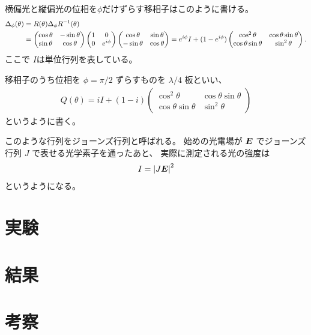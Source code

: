 \documentclass[9pt,dvipdfmx,a4paper]{jsarticle}
\begin{document}
横偏光と縦偏光の位相を\(\phi\)だけずらす移相子はこのように書ける。
\begin{align}
    \Delta_\phi(\theta) &= R(\theta) \Delta_\phi  R^{-1}(\theta) \notag\\
    &= \begin{pmatrix}
        \cos \theta & -\sin\theta\\
        \sin\theta & \cos\theta
    \end{pmatrix}
    \begin{pmatrix}
        1 & 0\\
        0 & e^{i\phi}
    \end{pmatrix}
    \begin{pmatrix}
        \cos \theta & \sin\theta\\
        -\sin\theta & \cos\theta
    \end{pmatrix}
    =e^{i\phi} I + (1-e^{i\phi})\begin{pmatrix}
        \cos^2 \theta & \cos\theta\sin\theta\\
        \cos\theta\sin\theta & \sin^2\theta
    \end{pmatrix}.
\end{align}
ここで \(I\)は単位行列を表している。

移相子のうち位相を \(\phi = \pi/2\) ずらすものを \(\lambda/4\) 板といい、
\begin{align}
    Q(\theta)
    =iI + (1-i)\begin{pmatrix}
        \cos^2 \theta & \cos\theta\sin\theta\\
        \cos\theta\sin\theta & \sin^2\theta
    \end{pmatrix}
\end{align}
というように書く。

このような行列をジョーンズ行列と呼ばれる。
始めの光電場が \(\vb*{E}\) でジョーンズ行列 \(J\) で表せる光学素子を通ったあと、
実際に測定される光の強度は
\begin{align}
    I = \abs{J\vb*{E}}^2
\end{align}
というようになる。

\section{実験}

\section{結果}

\section{考察}
\end{document}
